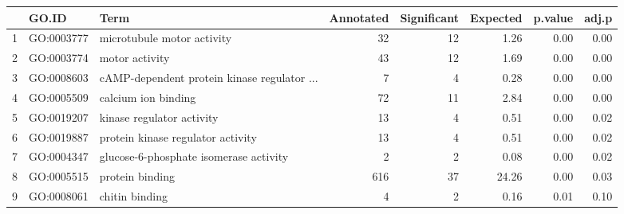 \begin{table}[ht]
\centering
\begin{tabular}{rllrrrrr}
  \hline
 & GO.ID & Term & Annotated & Significant & Expected & p.value & adj.p \\ 
  \hline
1 & GO:0003777 & microtubule motor activity &  32 &  12 & 1.26 & 0.00 & 0.00 \\ 
  2 & GO:0003774 & motor activity &  43 &  12 & 1.69 & 0.00 & 0.00 \\ 
  3 & GO:0008603 & cAMP-dependent protein kinase regulator ... &   7 &   4 & 0.28 & 0.00 & 0.00 \\ 
  4 & GO:0005509 & calcium ion binding &  72 &  11 & 2.84 & 0.00 & 0.00 \\ 
  5 & GO:0019207 & kinase regulator activity &  13 &   4 & 0.51 & 0.00 & 0.02 \\ 
  6 & GO:0019887 & protein kinase regulator activity &  13 &   4 & 0.51 & 0.00 & 0.02 \\ 
  7 & GO:0004347 & glucose-6-phosphate isomerase activity &   2 &   2 & 0.08 & 0.00 & 0.02 \\ 
  8 & GO:0005515 & protein binding & 616 &  37 & 24.26 & 0.00 & 0.03 \\ 
  9 & GO:0008061 & chitin binding &   4 &   2 & 0.16 & 0.01 & 0.10 \\ 
   \hline
\end{tabular}
\end{table}

